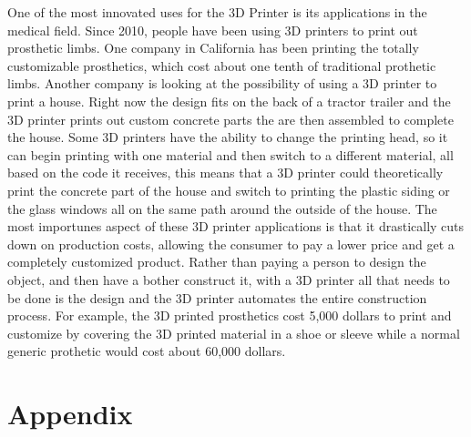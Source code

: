 \documentclass[12pt,twocolumn]{article}
\begin{document}
\indent	One of the most innovated uses for the 3D Printer is its applications in the medical field. Since 2010, people have been using 3D printers to print out prosthetic limbs. One company in California has been printing the totally customizable prosthetics, which cost about one tenth of traditional prothetic limbs. Another company is looking at the possibility of using a 3D printer to print a house. Right now the design fits on the back of a tractor trailer and the 3D printer prints out custom concrete parts the are then assembled to complete the house. Some 3D printers have the ability to change the printing head, so it can begin printing with one material and then switch to a different material, all based on the code it receives, this means that a 3D printer could theoretically print the concrete part of the house and switch to printing the plastic siding or the glass windows all on the same path around the outside of the house. The most importunes aspect of these 3D printer applications is that it drastically cuts down on production costs, allowing the consumer to pay a lower price and get a completely customized product. Rather than paying a person to design the object, and then have a bother construct it, with a 3D printer all that needs to be done is the design and the 3D printer automates the entire construction process. For example, the 3D printed prosthetics cost 5,000 dollars to print and customize by covering the 3D printed material in a shoe or sleeve while a normal generic prothetic would cost about 60,000 dollars. \cite{cite5}


\cite{cite6}


\cite{cite7}



\section{}


\section{Appendix} 
\end{document}
